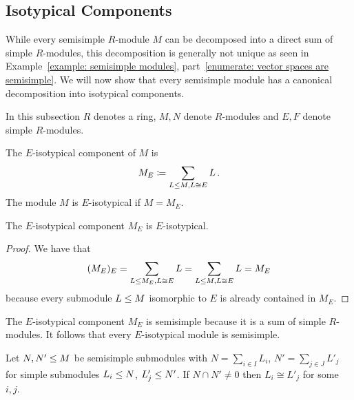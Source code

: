 \subsection{Isotypical Components}


\begin{fluff}
  While every semisimple $R$-module $M$ can be decomposed into a direct sum of simple $R$-modules, this decomposition is generally not unique as seen in Example~\ref{example: semisimple modules}, part~\ref*{enumerate: vector spaces are semisimple}.
  We will now show that every semisimple module has a canonical decomposition into isotypical components.
\end{fluff}


\begin{conventions}
  In this subsection $R$ denotes a ring, $M, N$ denote $R$-modules and $E, F$ denote simple $R$-modules.
\end{conventions}


\begin{definition}
  The $E$-isotypical component of $M$ is
  \[
              M_E
    \coloneqq  \sum_{L \leq M, L \cong E} L \,.
  \]
  The module $M$ is $E$-isotypical if $M = M_E$.
\end{definition}


\begin{lemma}
  The $E$-isotypical component $M_E$ is $E$-isotypical.
\end{lemma}


\begin{proof}
  We have that
  \[
      (M_E)_E
    = \sum_{L \leq M_E, L \cong E} L
    = \sum_{L \leq M, L \cong E} L
    = M_E
  \]
  because every submodule $L \leq M$ isomorphic to $E$ is already contained in $M_E$.
\end{proof}


\begin{remark}
  The $E$-isotypical component $M_E$ is semisimple because it is a sum of simple $R$-modules.
  It follows that every $E$-isotypical module is semisimple.
\end{remark}


\begin{lemma}
  \label{lemma: intersection of semisimple sums}
  Let $N, N' \leq M$ be semisimple submodules with $N = \sum_{i \in I} L_i$, $N' = \sum_{j \in J} L'_j$ for simple submodules $L_i \leq N$, $L'_j \leq N'$.
  If $N \cap N' \neq 0$ then $L_i \cong L'_j$ for some $i, j$.
\end{lemma}


